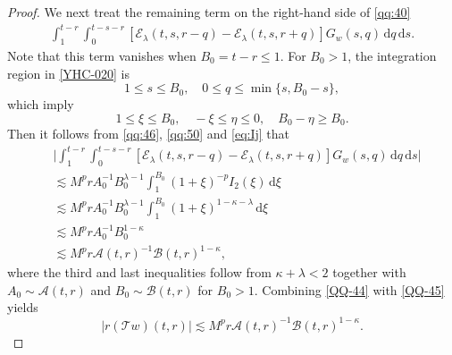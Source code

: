 \documentclass[11pt,twoside]{article}
\newcommand{\Acal}{\mathcal A}
\newcommand{\Bcal}{\mathcal B}
\newcommand{\dd}{\,\mathrm{d}}
\newcommand{\Ecal}{\mathcal E}
\newcommand{\Tcal}{\mathcal T}
\theoremstyle{plain}
\theoremstyle{definition}
\theoremstyle{remark}
\numberwithin{equation}{section}
\begin{document}
\begin{proof}
We next treat the remaining term on the right-hand side of
\eqref{qq:40}
\begin{equation}\label{YHC-020}
\begin{aligned}
\int_1^{t-r}
\int_0^{t-s-r}
\left[
\Ecal_\lambda(t,s,r-q)
-
\Ecal_\lambda(t,s,r+q)
\right]
G_w(s,q)\dd q\dd s.
\end{aligned}
\end{equation}
Note that this term vanishes when $B_0=t-r\leq1$. For $B_0>1$, the
integration region in \eqref{YHC-020} is
\[
1\leq s\leq B_0,
\quad
0\leq q\leq\min\{s,B_0-s\},
\]
which  imply
\[
1\leq\xi\leq B_0,
\quad
-\xi\leq\eta\leq0,\quad B_0-\eta\geq B_0.
\]
Then it follows from \eqref{qq:46},
\eqref{qq:50} and \eqref{eq:Ij} that
\begin{equation}\label{QQ-45}
\begin{aligned}
&\big|
\int_1^{t-r}
\int_0^{t-s-r}
\left[
\Ecal_\lambda(t,s,r-q)
-
\Ecal_\lambda(t,s,r+q)
\right]
G_w(s,q)\dd q\dd s
\big|\\
&\lesssim
M^p rA_0^{-1}B_0^{\lambda-1}
\int_1^{B_0}
(1+\xi)^{-p}I_2(\xi)\dd\xi\\
&\lesssim
M^p rA_0^{-1}B_0^{\lambda-1}
\int_1^{B_0}
(1+\xi)^{1-\kappa-\lambda}\dd\xi\\
&\lesssim
M^p rA_0^{-1}B_0^{1-\kappa}\\
&\lesssim
M^p r
\Acal(t,r)^{-1}
\Bcal(t,r)^{1-\kappa},
\end{aligned}
\end{equation}
where the third and last inequalities follow from
$\kappa+\lambda<2$ together with
$A_0\sim\Acal(t,r)$ and $B_0\sim\Bcal(t,r)$ for $B_0>1$. Combining \eqref{QQ-44} with
\eqref{QQ-45} yields
\begin{equation}
\label{qq:51}
|r(\Tcal w)(t,r)|
\lesssim
M^p r
\Acal(t,r)^{-1}
\Bcal(t,r)^{1-\kappa}.
\end{equation}


\end{proof}
\end{document}
